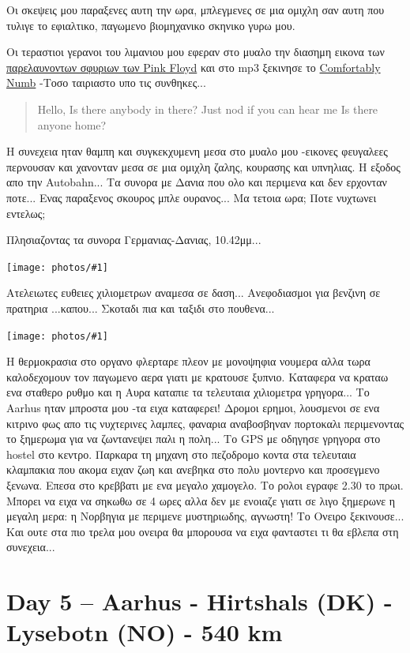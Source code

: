 \documentclass[11pt, letterpaper]{book}
\newcommand\photo[1]{\begin{center}\noindent\texttt{[image: photos/\#1]}\end{center}}
\begin{document}
Οι σκεψεις μου παραξενες αυτη την ωρα, μπλεγμενες σε μια ομιχλη σαν αυτη που τυλιγε το εφιαλτικο, παγωμενο βιομηχανικο σκηνικο γυρω μου.

Οι τεραστιοι γερανοι του λιμανιου μου εφεραν στο μυαλο την διασημη εικονα των \href{http://upload.wikimedia.org/wikipedia/en/0/03/Pinkfloydhammers.jpg}{παρελαυνοντων σφυριων των Pink Floyd} και στο mp3 ξεκινησε το \href{http://www.youtube.com/watch?v=jySUpMqmzd4}{Comfortably Numb} -Tοσο ταιριαστο υπο τις συνθηκες...

\begin{verse}
Hello,
Is there anybody in there?
Just nod if you can hear me
Is there anyone home?
\end{verse}

Η συνεχεια ηταν θαμπη και συγκεκχυμενη μεσα στο μυαλο μου -εικονες φευγαλεες περνουσαν και χανονταν μεσα σε μια ομιχλη ζαλης, κουρασης και υπνηλιας. Η εξοδος απο την Autobahn... Τα συνορα με Δανια που ολο και περιμενα και δεν ερχονταν ποτε... Ενας παραξενος σκουρος μπλε ουρανος... Μα τετοια ωρα; Ποτε νυχτωνει εντελως; 

Πλησιαζοντας τα συνορα Γερμανιας-Δανιας, 10.42μμ...

\photo{134.jpg}

Ατελειωτες ευθειες χιλιομετρων αναμεσα σε δαση... Ανεφοδιασμοι για βενζινη σε πρατηρια ...καπου... Σκοταδι πια και ταξιδι στο πουθενα...

\photo{135.jpg}

Η θερμοκρασια στο οργανο φλερταρε πλεον με μονοψηφια νουμερα αλλα τωρα καλοδεχομουν τον παγωμενο αερα γιατι με κρατουσε ξυπνιο. Καταφερα να κραταω ενα σταθερο ρυθμο και η Αυρα καταπιε τα τελευταια χιλιομετρα γρηγορα... 
Το Aarhus ηταν μπροστα μου -τα ειχα καταφερει! Δρομοι ερημοι, λουσμενοι σε ενα κιτρινο φως απο τις νυχτερινες λαμπες, φαναρια αναβοσβηναν πορτοκαλι περιμενοντας το ξημερωμα για να ζωντανεψει παλι η πολη... 
Το GPS με οδηγησε γρηγορα στο hostel στο κεντρο. 
Παρκαρα τη μηχανη στο πεζοδρομο κοντα στα τελευταια κλαμπακια που ακομα ειχαν ζωη και ανεβηκα στο πολυ μοντερνο και προσεγμενο ξενωνα. 
Επεσα στο κρεββατι με ενα μεγαλο χαμογελο. Το ρολοι εγραφε 2.30 το πρωι. 
Μπορει να ειχα να σηκωθω σε 4 ωρες αλλα δεν με ενοιαζε γιατι σε λιγο ξημερωνε η μεγαλη μερα: η Νορβηγια με περιμενε μυστηριωδης, αγνωστη! 
Το Ονειρο ξεκινουσε... Και ουτε στα πιο τρελα μου ονειρα θα μπορουσα να ειχα φανταστει τι θα εβλεπα στη συνεχεια...

\chapter{Day 5 -- Aarhus - Hirtshals (DK) - Lysebotn (NO) - 540 km}
\end{document}

